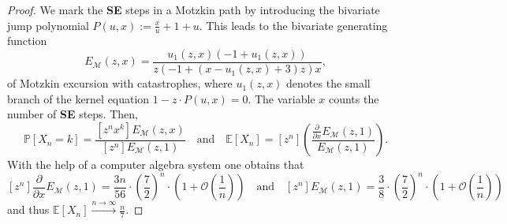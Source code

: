 \documentclass[10pt,a4paper]{amsart}
\begin{document}
\begin{proof}
  We mark the \textbf{SE} steps in a Motzkin path by introducing the bivariate jump polynomial $P(u,x) := \frac{x}{u} + 1 + u$. 
  This leads to the bivariate generating function
  \[
  E_\mathcal{M}(z,x) = \frac{u_1(z,x) \left(-1+u_1(z,x) \right)}{z \left(-1+\left(x -u_1(z,x) +3\right) z \right) x},
  \]
  of Motzkin excursion with catastrophes, where $u_1(z,x)$ denotes the small branch of the kernel equation $1 - z \cdot P(u,x) = 0$. The variable $x$ counts the number of \textbf{SE} steps.
   Then, 
  \[
    \mathbb{P}[X_n = k] = \frac{[z^n x^k] E_\mathcal{M}(z,x)}{[z^n] E_\mathcal{M}(z,1)} \quad \text{and} \quad \mathbb{E}[X_n] = [z^n] \left(\frac{\frac{\partial}{\partial x} E_\mathcal{M}(z,1)}{ E_\mathcal{M}(z,1)}\right).
  \]
  With the help of a computer algebra system one obtains that
  \[
    [z^n] \frac{\partial}{\partial x} E_\mathcal{M}(z,1) = \frac{3n}{56} \cdot \left( \frac{7}{2}\right)^n \cdot \left(1 + \mathcal{O}\left(\frac{1}{n}\right)\right)  \quad \text{and} \quad [z^n] E_\mathcal{M}(z,1) = \frac{3}{8} \cdot \left( \frac{7}{2}\right)^n \cdot \left(1 + \mathcal{O}\left(\frac{1}{n}\right)\right)
  \]
  and thus $\mathbb{E}[X_n] \xrightarrow[]{{n \to \infty}} \frac{n}{7}$.
\end{proof}
\end{document}
